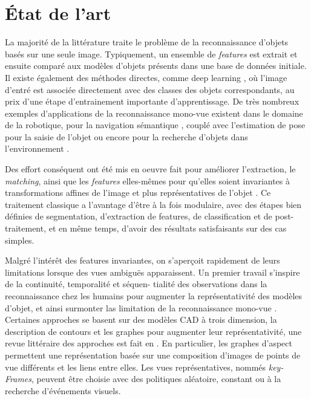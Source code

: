 
\section{État de l'art}

La majorité de la littérature traite le problème de la reconnaissance d'objets basés sur une seule image. Typiquement, un ensemble de \textit{features} \cite{aldoma2012our, aldoma2011cad, frome2004recognizing,tombari2010unique} est extrait et ensuite comparé aux modèles d'objets présents dans une base de données initiale. Il existe également des méthodes directes, comme deep learning \cite{krizhevsky2012imagenet}, où l'image d'entré est associée directement avec des classes des objets correspondants, au prix d'une étape d'entrainement importante d'apprentissage. De très nombreux exemples d'applications de la reconnaissance mono-vue existent dans le domaine de la robotique, pour la navigation sémantique \cite{caron2014neural}, couplé avec l'estimation de pose pour la saisie de l'objet \cite{burel1995three} ou encore pour la recherche d'objets dans l'environnement \cite{kragic2009object,ali2014contextual}.

Des effort conséquent ont été mis en oeuvre fait pour améliorer l'extraction, le \textit {matching}, ainsi que les \textit{features} elles-mêmes pour qu'elles soient invariantes à transformations affines de l'image et plus représentatives de l'objet \cite{abdel2006csift}. Ce traitement classique a l’avantage d'être à la fois modulaire, avec des étapes bien définies de segmentation, d'extraction de features, de classification et de post-traitement, et en même temps, d'avoir des résultats satisfaisants sur des cas simples. 

Malgré l'intérêt des features invariantes, on s'aperçoit rapidement de leurs limitations lorsque des vues ambiguës apparaissent. Un premier travail s'inspire de la continuité, temporalité et séquen- tialité des observations dans la reconnaissance chez les humains pour augmenter la représentativité des modèles d'objet, et ainsi surmonter las limitation de la reconnaissance mono-vue \cite{bulthoff2002view}. Certaines approches se basent sur des modèles CAD à trois dimension, la description de contours et les graphes pour augmenter leur représentativité, une revue littéraire des approches est fait en \cite{roy2004active}. En particulier, les graphes d'aspect \cite{roy2000isolated} permettent une représentation basée sur une composition d'images de points de vue différents et les liens entre elles.  Les vues représentatives, nommés \textit{key-Frames}, peuvent être choisie avec des politiques aléatoire, constant ou à la recherche d'événements visuels. 

